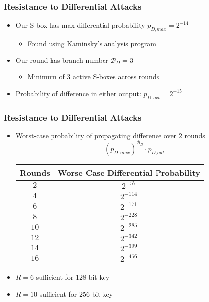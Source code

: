\begin{frame}
\frametitle{Resistance to Differential Attacks}
\begin{itemize}
  \item Our S-box has max differential probability $p_{D,max} = 2^{-14}$
  \begin{itemize}
    \item Found using Kaminsky's analysis program
  \end{itemize}
  \item Our round has branch number $\mathcal{B}_D = 3$
  \begin{itemize}
    \item Minimum of $3$ active S-boxes across rounds
  \end{itemize}
  \item Probability of difference in either output: $p_{D,out} = 2^{-15}$
\end{itemize}
\end{frame}

\begin{frame}
\frametitle{Resistance to Differential Attacks}
\begin{itemize}
  \item Worst-case probability of propagating difference over $2$ rounds
  \begin{equation*}
  (p_{D,max})^{\mathcal{B}_D} \cdot p_{D,out}
  \end{equation*}
  \vfill
  \begin{center}
  \begin{tabular}{c|c}
  Rounds & Worse Case Differential Probability \\
  \hline
  $2$  & $2^{-57}$  \\
  $4$  & $2^{-114}$ \\
  $6$  & $2^{-171}$ \\
  $8$  & $2^{-228}$ \\
  $10$ & $2^{-285}$ \\
  $12$ & $2^{-342}$ \\
  $14$ & $2^{-399}$ \\
  $16$ & $2^{-456}$ \\
  \end{tabular}
  \end{center}
  \vfill
  \item $R = 6$ sufficient for $128$-bit key
  \item $R = 10$ sufficient for $256$-bit key
\end{itemize}
\end{frame}

